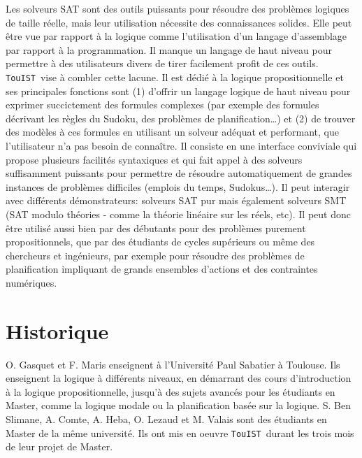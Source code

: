 \documentclass{iaf}
\newcommand{\nameTool}{{\sc \texttt {TouIST}}}
\begin{document}
\creationEntete

\begin{resume}
Les solveurs SAT sont des outils puissants pour r\'{e}soudre des probl\`{e}mes logiques de taille r\'eelle, mais leur utilisation n\'{e}cessite des connaissances solides. Elle peut \^{e}tre vue par rapport \`a la logique comme l'utilisation d'un langage d'assemblage par rapport \`a la programmation. Il manque un langage de haut niveau pour permettre \`a des utilisateurs divers de tirer facilement profit de ces outils. \nameTool\ vise \`a combler cette lacune.
Il est d\'edi\'e \`a la logique propositionnelle et ses principales fonctions sont (1) d'offrir un langage logique de haut niveau pour exprimer succictement des formules complexes (par exemple des formules d\'ecrivant les r\`egles du Sudoku, des probl\`emes de planification\ldots) et (2) de trouver des mod\`eles \`a ces formules en utilisant un solveur ad\'equat et performant, que l'utilisateur n'a pas besoin de conna\^{i}tre.
Il consiste en une interface conviviale qui propose plusieurs facilit\'es syntaxiques et qui fait appel \`a des solveurs suffisamment puissants pour permettre de r\'esoudre automatiquement de grandes instances de probl\`emes difficiles (emplois du temps, Sudokus\ldots). Il peut interagir avec diff\'erents d\'emonstrateurs: solveurs SAT pur mais \'egalement solveurs SMT (SAT modulo th\'eories - comme la th\'eorie lin\'eaire sur les r\'eels, etc). Il peut donc \^{e}tre utilis\'e aussi bien par des d\'ebutants pour  des probl\`emes purement propositionnels, que par des \'etudiants de cycles sup\'erieurs ou m\^{e}me des chercheurs et ing\'enieurs, par exemple pour r\'esoudre des probl\`emes de planification impliquant de grands ensembles d'actions et des contraintes num\'eriques.
\end{resume}






\section{Historique}\label{sec:introduction}

O. Gasquet et F. Maris enseignent \`a l'Universit\'e Paul Sabatier \`a Toulouse. Ils enseignent la logique \`a diff\'erents niveaux, en d\'{e}marrant des cours d'introduction \`a la logique propositionnelle, jusqu'\`a des sujets avanc\'es pour les \'etudiants en Master, comme la logique modale ou la planification bas\'ee sur la logique. S. Ben Slimane, A. Comte, A. Heba, O. Lezaud et M. Valais sont des \'etudiants en Master de la m\^eme universit\'e. Ils ont mis en oeuvre \nameTool\ durant les trois mois de leur projet de Master.
\end{document}
